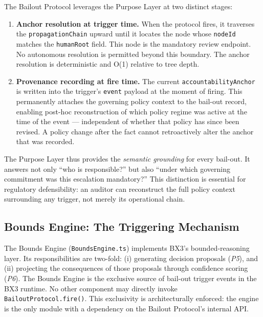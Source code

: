 The Bailout Protocol leverages the Purpose Layer at two distinct stages:

\begin{enumerate}
  \item \textbf{Anchor resolution at trigger time.}  When the protocol fires, it
        traverses the \texttt{propagationChain} upward until it locates the node
        whose \texttt{nodeId} matches the \texttt{humanRoot} field.  This node is the
        mandatory review endpoint.  No autonomous resolution is permitted beyond this
        boundary.  The anchor resolution is deterministic and O(1) relative to tree depth.

  \item \textbf{Provenance recording at fire time.}  The current
        \texttt{accountabilityAnchor} is written into the trigger's \texttt{event}
        payload at the moment of firing.  This permanently attaches the governing
        policy context to the bail-out record, enabling post-hoc reconstruction of
        which policy regime was active at the time of the event — independent of
        whether that policy has since been revised.  A policy change after the fact
        cannot retroactively alter the anchor that was recorded.
\end{enumerate}

The Purpose Layer thus provides the \emph{semantic grounding} for every bail-out.
It answers not only ``who is responsible?'' but also ``under which governing
commitment was this escalation mandatory?''  This distinction is essential for
regulatory defensibility: an auditor can reconstruct the full policy context
surrounding any trigger, not merely its operational chain.

\subsection{Bounds Engine: The Triggering Mechanism}

The Bounds Engine (\texttt{BoundsEngine.ts}) implements BX3's bounded-reasoning
layer.  Its responsibilities are two-fold: (i) generating decision proposals
(\emph{P5}), and (ii) projecting the consequences of those proposals through
confidence scoring (\emph{P6}).  The Bounds Engine is the exclusive source of
bail-out trigger events in the BX3 runtime.  No other component may directly invoke
\texttt{Bailout\-Protocol.fire()}.  This exclusivity is architecturally enforced:
the engine is the only module with a dependency on the Bailout Protocol's internal API.


